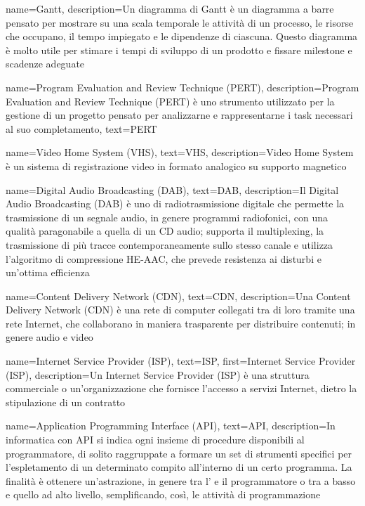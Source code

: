 {
    name={Gantt},
    description={Un diagramma di Gantt è un diagramma a barre pensato per mostrare su una scala temporale le attività di un processo, le risorse che occupano, il tempo impiegato e le dipendenze di ciascuna. Questo diagramma è molto utile per stimare i tempi di sviluppo di un prodotto e fissare milestone e scadenze adeguate}
}

{
    name={Program Evaluation and Review Technique (PERT)},
    description={Program Evaluation and Review Technique (PERT) è uno strumento utilizzato per la gestione di un progetto pensato per analizzarne e rappresentarne i task necessari al suo completamento},
    text={PERT}
}

{
    name={Video Home System (VHS)},
    text={VHS},
    description={Video Home System è un sistema di registrazione video in formato analogico su supporto magnetico}
}

{
    name={Digital Audio Broadcasting (DAB)},
    text={DAB},
    description={Il Digital Audio Broadcasting (DAB) è uno  di radiotrasmissione digitale che permette la trasmissione di un segnale audio, in genere programmi radiofonici, con una qualità paragonabile a quella di un \gls{CD} audio; supporta il multiplexing, la trasmissione di più tracce contemporaneamente sullo stesso canale e utilizza l'algoritmo di compressione HE-AAC, che prevede resistenza ai disturbi e un'ottima efficienza}
}

{
    name={Content Delivery Network (CDN)},
    text={CDN},
    description={Una Content Delivery Network (CDN) è una rete di computer collegati tra di loro tramite una rete Internet, che collaborano in maniera trasparente per distribuire contenuti; in genere  audio e video}
}

{
    name={Internet Service Provider (ISP)},
    text={ISP},
    first={Internet Service Provider (ISP)},
    description={Un Internet Service Provider (ISP) è una struttura commerciale o un'organizzazione che fornisce l'accesso a servizi Internet, dietro la stipulazione di un contratto}
}


{
    name={Application Programming Interface (API)},
    text={API},
    description={In informatica con API si indica ogni insieme di procedure disponibili al programmatore, di solito raggruppate a formare un set
    di strumenti specifici per l’espletamento di un determinato compito all’interno
    di un certo programma. La finalità è ottenere un’astrazione, in genere tra
    l’ e il programmatore o tra  a basso e quello ad alto livello,
    semplificando, così, le attività di programmazione}
}

